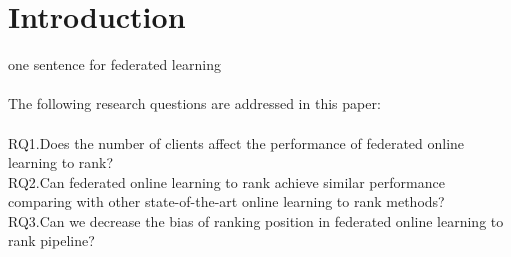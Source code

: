 \section{Introduction}

one sentence for federated learning\\
\\
The following research questions are addressed in this paper:\\
\\
RQ1.Does the number of clients affect the performance of federated online learning to rank?\\
RQ2.Can federated online learning to rank achieve similar performance comparing with other state-of-the-art online learning to rank methods?\\
RQ3.Can we decrease the bias of ranking position in federated online learning to rank pipeline?\\
